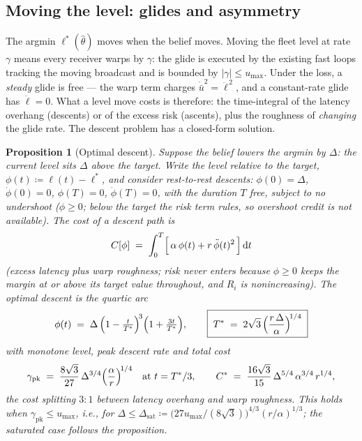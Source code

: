 \documentclass[11pt, a4paper]{article}
\theoremstyle{definition}
\theoremstyle{plain}
\newtheorem{proposition}[theorem]{Proposition}
\theoremstyle{remark}
\newcommand{\dd}{\,\mathrm{d}}
\begin{document}
\subsection{Moving the level: glides and asymmetry}\label{sec:glide}

The argmin $\ell^*(\hat\theta)$ moves when the belief moves.  Moving
the fleet level at rate $\gamma$ means every receiver warps by
$\gamma$: the glide is executed by the existing fast loops tracking the
moving broadcast and is bounded by $|\gamma| \le u_{\max}$.  Under the
loss, a \emph{steady} glide is free --- the warp term charges
$\dot{\bar u}^2 = \ddot\ell^{\,2}$, and a constant-rate glide has
$\ddot\ell = 0$.  What a level move costs is therefore: the
time-integral of the latency overhang (descents) or of the excess risk
(ascents), plus the roughness of \emph{changing} the glide rate.  The
descent problem has a closed-form solution.

\begin{proposition}[Optimal descent]\label{prop:descent}
Suppose the belief lowers the argmin by $\Delta$: the current level
sits $\Delta$ above the target.  Write the level relative to the
target, $\phi(t) \coloneqq \ell(t) - \ell^*$, and consider rest-to-rest
descents: $\phi(0)=\Delta$, $\dot\phi(0)=0$, $\phi(T)=0$,
$\dot\phi(T)=0$, with the duration $T$ free, subject to no undershoot
($\phi \ge 0$; below the target the risk term rules, so overshoot
credit is not available).  The cost of a descent path is
\begin{equation}\label{eq:descent-cost-functional}
  C[\phi] \;=\; \int_0^T \Bigl[\,\alpha\,\phi(t)
    + r\,\ddot\phi(t)^2\,\Bigr]\dd t
\end{equation}
(excess latency plus warp roughness; risk never enters because
$\phi \ge 0$ keeps the margin at or above its target value throughout,
and $R_i$ is nonincreasing).  The optimal descent is the quartic arc
\begin{equation}\label{eq:descent-arc}
  \phi(t) \;=\; \Delta\,\Bigl(1 - \tfrac{t}{T^*}\Bigr)^{\!3}
    \Bigl(1 + \tfrac{3t}{T^*}\Bigr),
  \qquad
  \boxed{\;T^* \;=\; 2\sqrt3\,\Bigl(\frac{r\,\Delta}{\alpha}
    \Bigr)^{\!1/4}\;}
\end{equation}
with monotone level, peak descent rate and total cost
\begin{equation}\label{eq:descent-numbers}
  \gamma_{\mathrm{pk}}
  \;=\; \frac{8\sqrt3}{27}\,\Delta^{3/4}
    \Bigl(\frac{\alpha}{r}\Bigr)^{\!1/4}
  \quad\text{at } t = T^*/3,
  \qquad
  C^* \;=\; \frac{16\sqrt3}{15}\,
    \Delta^{5/4}\,\alpha^{3/4}\,r^{1/4},
\end{equation}
the cost splitting $3{:}1$ between latency overhang and warp
roughness.  This holds when $\gamma_{\mathrm{pk}} \le u_{\max}$, i.e.,
for $\Delta \le \Delta_{\mathrm{sat}} \coloneqq
\bigl(27 u_{\max}/(8\sqrt3)\bigr)^{4/3} (r/\alpha)^{1/3}$; the
saturated case follows the proposition.
\end{proposition}
\end{document}
